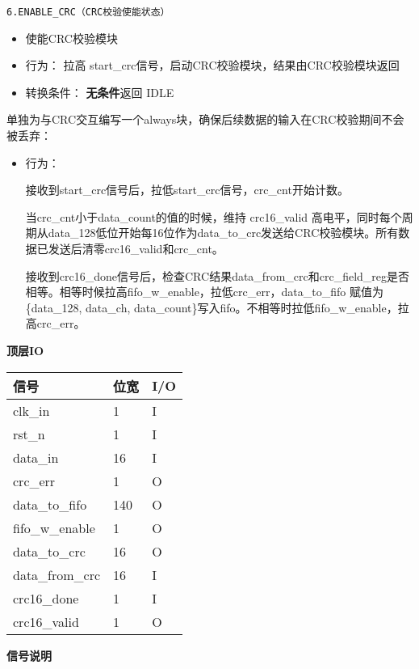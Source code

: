\documentclass[12pt,]{article}
\begin{document}
\texttt{6.\hspace{0pt}ENABLE\_CRC\hspace{0pt}（CRC校验使能状态）}

\begin{itemize}
\item
  使能CRC校验模块
\item
  行为： 拉高 start\_crc信号，启动CRC校验模块，结果由CRC校验模块返回
\item
  转换条件： \textbf{无条件}返回 IDLE
\end{itemize}

单独为与CRC交互编写一个always块，确保后续数据的输入在CRC校验期间不会被丢弃：

\begin{itemize}
\item
  行为：

  接收到start\_crc信号后，拉低start\_crc信号，crc\_cnt开始计数。

  当crc\_cnt小于data\_count的值的时候，维持 crc16\_valid
  高电平，同时每个周期从data\_128低位开始每16位作为data\_to\_crc发送给CRC校验模块。所有数据已发送后清零crc16\_valid和crc\_cnt。

  接收到crc16\_done信号后，检查CRC结果data\_from\_crc和crc\_field\_reg是否相等。相等时候拉高fifo\_w\_enable，拉低crc\_err，data\_to\_fifo
  赋值为\{data\_128, data\_ch,
  data\_count\}写入fifo。不相等时拉低fifo\_w\_enable，拉高crc\_err。
\end{itemize}

\textbf{顶层IO}

\begin{longtable}[]{@{}lll@{}}
\toprule\noalign{}
信号 & 位宽 & I/O \\
\midrule\noalign{}
\endhead
\bottomrule\noalign{}
\endlastfoot
clk\_in & 1 & I \\
rst\_n & 1 & I \\
data\_in & 16 & I \\
crc\_err & 1 & O \\
data\_to\_fifo & 140 & O \\
fifo\_w\_enable & 1 & O \\
data\_to\_crc & 16 & O \\
data\_from\_crc & 16 & I \\
crc16\_done & 1 & I \\
crc16\_valid & 1 & O \\
\end{longtable}

\textbf{信号说明}
\end{document}
